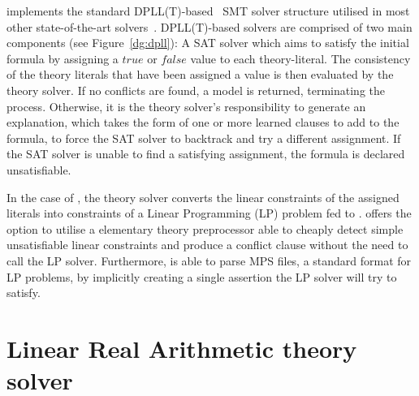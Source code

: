 \documentclass[runningheads]{llncs}
\begin{document}
\dlinear implements the standard DPLL(T)-based~\cite{ref:dpll-t} SMT solver structure utilised in most other state-of-the-art solvers~\cite{ref:z3-dpll-t}.
DPLL(T)-based solvers are comprised of two main components (see Figure~\ref{dg:dpll}):
A SAT solver which aims to satisfy the initial formula by assigning a $true$ or $false$ value to each theory-literal.
The consistency of the theory literals that have been assigned a value is then evaluated by the theory solver.
If no conflicts are found, a model is returned, terminating the process.
Otherwise, it is the theory solver's responsibility to generate an explanation, which takes the form of one or more learned clauses to add to the formula, to force the SAT solver to backtrack and try a different assignment.
If the SAT solver is unable to find a satisfying assignment, the formula is declared unsatisfiable.

In the case of \dlinear, the theory solver converts the linear constraints of the assigned literals into constraints of a Linear Programming (LP) problem fed to \soplex.
\dlinear offers the option to utilise a elementary theory preprocessor able to cheaply detect simple unsatisfiable linear constraints and produce a conflict clause without the need to call the LP solver.
Furthermore, \dlinear is able to parse MPS files, a standard format for LP problems, by implicitly creating a single assertion the LP solver will try to satisfy.

\section{Linear Real Arithmetic theory solver}
\end{document}

